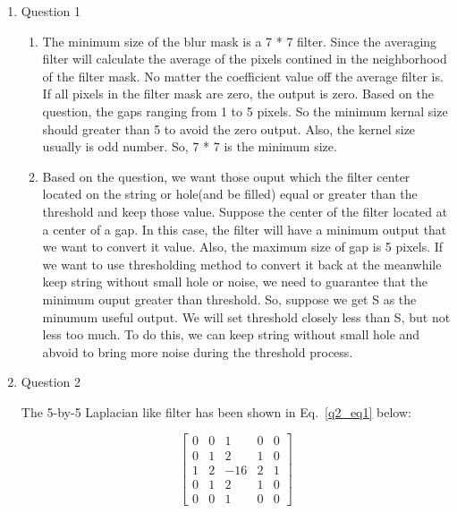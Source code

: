 \documentclass[12pt]{article}
\begin{document}
\begin{enumerate}[leftmargin=\labelsep]
\item Question 1
    \begin{enumerate}
    \item The minimum size of the blur mask is a 7 * 7 filter.
    Since the averaging filter will calculate the average of the pixels contined in the neighborhood of the filter mask. 
    No matter the coefficient value off the average filter is. 
    If all pixels in the filter mask are zero, the output is zero. 
    Based on the question, the gaps ranging from 1 to 5 pixels. 
    So the minimum kernal size should greater than 5 to avoid the zero output.
    Also, the kernel size usually is odd number.
    So, 7 * 7 is the minimum size.

    \vspace*{1em}

    
    \item Based on the question, we want those ouput which the filter center located on the string or hole(and be filled) equal or greater than the threshold and keep those value.
    Suppose the center of the filter located at a center of a gap. 
    In this case, the filter will have a minimum output that we want to convert it value. 
    Also, the maximum size of gap is 5 pixels.  
    If we want to use thresholding method to convert it back at the meanwhile keep string without small hole or noise, we need to guarantee that the minimum ouput greater than threshold.
    So, suppose we get S as the minumum useful output.
    We will set threshold closely less than S, but not less too much. 
    To do this, we can keep string without small hole and abvoid to bring more noise during the threshold process.
    \vspace*{1em}


    \end{enumerate}

\item Question 2

The 5-by-5 Laplacian like filter has been shown in Eq.~\ref{q2_eq1} below: 

\begin{equation}
\begin{bmatrix}
        0 & 0 & 1   & 0 & 0 \\
        0 & 1 & 2   & 1 & 0 \\
        1 & 2 & -16 & 2 & 1 \\
        0 & 1 & 2   & 1 & 0 \\
        0 & 0 & 1   & 0 & 0 
\end{bmatrix}
\label{q2_eq1}
\end{equation}


\end{enumerate}
\end{document}
